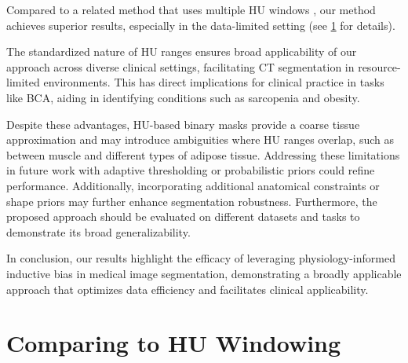 \documentclass[conference]{IEEEtran}
\begin{document}
Compared to a related method that uses multiple HU windows \cite{kloenne_domain-specific_2020}, our method achieves superior results, especially in the data-limited setting (see \cref{sec:hu-windowing} for details).

The standardized nature of HU ranges ensures broad applicability of our approach across diverse clinical settings, facilitating CT segmentation in resource-limited environments. This has direct implications for clinical practice in tasks like BCA, aiding in identifying conditions such as sarcopenia and obesity.

Despite these advantages, HU-based binary masks provide a coarse tissue approximation and may introduce ambiguities where HU ranges overlap, such as between muscle and different types of adipose tissue. Addressing these limitations in future work with adaptive thresholding or probabilistic priors could refine performance. Additionally, incorporating additional anatomical constraints or shape priors may further enhance segmentation robustness.
Furthermore, the proposed approach should be evaluated on different datasets and tasks to demonstrate its broad generalizability.

In conclusion, our results highlight the efficacy of leveraging physiology-informed inductive bias in medical image segmentation, demonstrating a broadly applicable approach that optimizes data efficiency and facilitates clinical applicability.





\vfill

\appendix

\section{Comparing to HU Windowing}\label{sec:hu-windowing}
\end{document}
